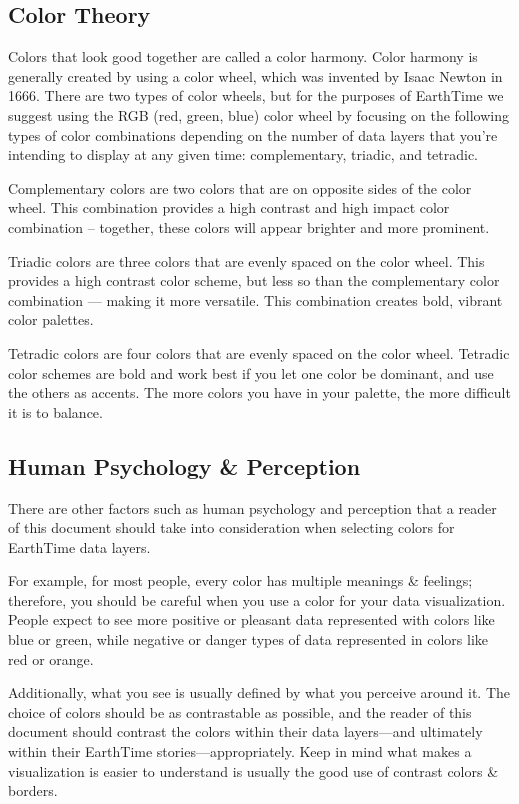\documentclass[
]{book}
\begin{document}
\hypertarget{color-theory}{%
\subsection*{Color Theory}\label{color-theory}}


Colors that look good together are called a color harmony. Color harmony is generally created by using a color wheel, which was invented by Isaac Newton in 1666. There are two types of color wheels, but for the purposes of EarthTime we suggest using the RGB (red, green, blue) color wheel by focusing on the following types of color combinations depending on the number of data layers that you're intending to display at any given time: complementary, triadic, and tetradic.

Complementary colors are two colors that are on opposite sides of the color wheel. This combination provides a high contrast and high impact color combination -- together, these colors will appear brighter and more prominent.

Triadic colors are three colors that are evenly spaced on the color wheel. This provides a high contrast color scheme, but less so than the complementary color combination --- making it more versatile. This combination creates bold, vibrant color palettes.

Tetradic colors are four colors that are evenly spaced on the color wheel. Tetradic color schemes are bold and work best if you let one color be dominant, and use the others as accents. The more colors you have in your palette, the more difficult it is to balance.

\hypertarget{human-psychology-perception}{%
\subsection*{Human Psychology \& Perception}\label{human-psychology-perception}}


There are other factors such as human psychology and perception that a reader of this document should take into consideration when selecting colors for EarthTime data layers.

For example, for most people, every color has multiple meanings \& feelings; therefore, you should be careful when you use a color for your data visualization. People expect to see more positive or pleasant data represented with colors like blue or green, while negative or danger types of data represented in colors like red or orange.

Additionally, what you see is usually defined by what you perceive around it. The choice of colors should be as contrastable as possible, and the reader of this document should contrast the colors within their data layers---and ultimately within their EarthTime stories---appropriately. Keep in mind what makes a visualization is easier to understand is usually the good use of contrast colors \& borders.
\end{document}
